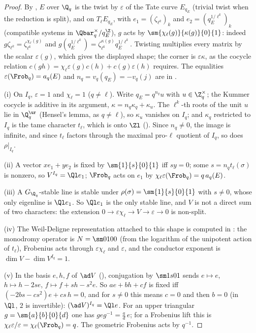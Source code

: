 \begin{proof}
By , $E$ over $\Q_q$ is the twist by $\varepsilon$ of the Tate curve $E_{q_E}$ (trivial twist when the reduction is split), and on
$T_\ell E_{q_E}$, with $e_1=(\zeta_{\ell^k})_k$ and $e_2=(q_E^{1/\ell^k})_k$ (compatible systems in $\Qbar_q^\times/q_E^{\Z}$), $g$ acts by $\sm{\chi_\ell(g)}{\kappa(g)}{0}{1}$: indeed
$g\zeta_{\ell^k}=\zeta_{\ell^k}^{\chi_\ell(g)}$ and $g(q_E^{1/\ell^k})=\zeta_{\ell^k}^{\kappa(g)}q_E^{1/\ell^k}$. Twisting multiplies every matrix by the scalar $\varepsilon(g)$, which gives the
displayed shape; the corner is $\varepsilon\kappa$, as the cocycle relation $c(gh)=\chi_\ell\varepsilon(g)c(h)+c(g)\varepsilon(h)$ requires. The equalities $\varepsilon(\Frob_q)=a_q(E)$ and
$n_q=v_q(q_E)=-v_q(j)$ are in .

(i) On $I_q$, $\varepsilon=1$ and $\chi_\ell=1$ ($q\ne\ell$). Write $q_E=q^{n_q}u$ with $u\in\Z_q^\times$; the Kummer cocycle is additive in its argument,
$\kappa=n_q\kappa_q+\kappa_u$. The $\ell^k$-th roots of the unit $u$ lie in $\Q_q^{\ur}$ (Hensel's lemma, as $q\ne\ell$), so $\kappa_u$ vanishes on $I_q$; and $\kappa_q$
restricted to $I_q$ is the tame character $t_\ell$, which is onto $\Zl$ (). Since $n_q\ne0$, the image is infinite, and since $t_\ell$
factors through the maximal pro-$\ell$ quotient of $I_q$, so does $\rho|_{I_q}$.

(ii) A vector $xe_1+ye_2$ is fixed by $\sm{1}{s}{0}{1}$ iff $sy=0$; some $s=n_qt_\ell(\sigma)$ is nonzero, so $V^{I_q}=\Ql e_1$; $\Frob_q$ acts on $e_1$ by
$\chi_\ell\varepsilon(\Frob_q)=q\,a_q(E)$.

(iii) A $G_{\Q_q}$-stable line is stable under $\rho(\sigma)=\sm{1}{s}{0}{1}$ with $s\ne0$, whose only eigenline is $\Ql e_1$. So $\Ql e_1$ is the only stable
line, and $V$ is not a direct sum of two characters: the extension $0\to\varepsilon\chi_\ell\to V\to\varepsilon\to0$ is non-split.

(iv) The Weil-Deligne representation attached to this shape is computed in : the monodromy operator is $N=\sm0100$ (from the
logarithm of the unipotent action of $t_\ell$), Frobenius acts through $\varepsilon\chi_\ell$ and $\varepsilon$, and the conductor exponent is
$\dim V-\dim V^{I_q}=1$.

(v) In the basis $e,h,f$ of $\ad V$ (), conjugation by $\sm1s01$ sends $e\mapsto e$, $h\mapsto h-2se$, $f\mapsto f+sh-s^2e$. So
$ae+bh+cf$ is fixed iff $(-2bs-cs^2)e+cs\,h=0$, and for $s\ne0$ this means $c=0$ and then $b=0$ (in $\Ql$, $2$ is invertible):
$(\ad V)^{I_q}=\Ql e$. For an upper triangular $g=\sm{a}{b}{0}{d}$ one has $geg^{-1}=\frac ad\,e$; for a Frobenius lift this is $\chi_\ell\varepsilon/\varepsilon=\chi_\ell(\Frob_q)=q$.
The geometric Frobenius acts by $q^{-1}$.
\end{proof}

